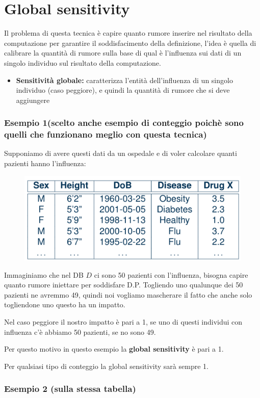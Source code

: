 \documentclass{report}
\begin{document}
\section{Global sensitivity}
Il problema di questa tecnica è capire quanto rumore inserire nel risultato della computazione per garantire il soddisfacimento della definizione,
l'idea è quella di calibrare la quantità di rumore sulla base di qual è l'influenza sui dati di un singolo individuo sul risultato della computazione.

\begin{itemize}
    \item \textbf{Sensitività globale:} caratterizza l'entità dell'influenza di un singolo individuo (caso peggiore), e quindi la quantità di rumore che si deve aggiungere 
\end{itemize}

\subsubsection{Esempio 1(scelto anche esempio di conteggio poichè sono quelli che funzionano meglio con questa tecnica)}

\noindent Supponiamo di avere questi dati da un ospedale e di voler calcolare quanti pazienti hanno l'influenza:
\begin{figure}[H]
        \centering
        \includegraphics[width=0.4\linewidth]{images/pazienti.png}
    \end{figure}
\noindent Immaginiamo che nel DB $D$ ci sono 50 pazienti con l'influenza, bisogna capire quanto rumore iniettare per soddisfare D.P.
Togliendo uno qualunque dei 50 pazienti ne avremmo 49, quindi noi vogliamo mascherare il fatto che anche solo togliendone uno questo ha un impatto.


\noindent Nel caso peggiore il nostro impatto è pari a 1, se uno di questi individui con influenza c'è abbiamo 50 pazienti, se no sono 49.

\noindent Per questo motivo in questo esempio la \textbf{global sensitivity} è pari a 1.

\noindent Per qualsiasi tipo di conteggio la global sensitivity sarà sempre 1. 

\subsubsection{Esempio 2 (sulla stessa tabella)}
\end{document}
